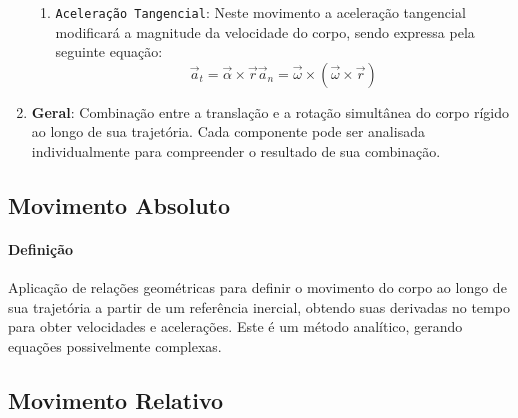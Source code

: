 \documentclass{article}
\begin{document}
\begin{enumerate}[rightmargin = \leftmargin]
\begin{enumerate}[rightmargin = \leftmargin]
                            \item \texttt{Aceleração Tangencial}: Neste movimento a aceleração tangencial modificará a magnitude da velocidade do corpo, sendo expressa pela seguinte equação:
                                \begin{equation}
                                    \boxed{
                                        \vec{a}_{t} = \vec{\alpha} \times \vec{r}
                                        \vec{a}_{n} = \vec{\omega} \times (\vec{\omega}\times\vec{r})
                                    }
                                \end{equation}
                        \end{enumerate}

                    \item \textbf{Geral}: Combinação entre a translação e a rotação simultânea do corpo rígido ao longo de sua trajetória. Cada componente pode ser analisada individualmente para compreender o resultado de sua combinação.
                \end{enumerate}

        \subsection{Movimento Absoluto}
            \paragraph{Definição}Aplicação de relações geométricas para definir o movimento do corpo ao longo de sua trajetória a partir de um referência inercial, obtendo suas derivadas no tempo para obter velocidades e acelerações. Este é um método analítico, gerando equações possivelmente complexas.

        \subsection{Movimento Relativo}
\end{document}
